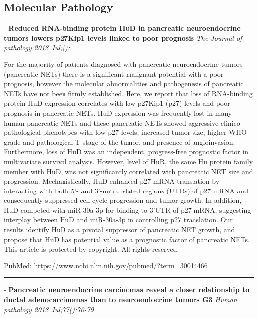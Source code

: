 \documentclass[]{article}
\begin{document}
\pagebreak

\hypertarget{molecular-pathology}{%
\subsection{Molecular Pathology}\label{molecular-pathology}}

 - \textbf{Reduced RNA-binding protein HuD in pancreatic neuroendocrine
tumors lowers p27Kip1 levels linked to poor prognosis} \emph{The Journal
of pathology 2018 Jul;():}

For the majority of patients diagnosed with pancreatic neuroendocrine
tumors (pancreatic NETs) there is a significant malignant potential with
a poor prognosis, however the molecular abnormalities and pathogenesis
of pancreatic NETs have not been firmly established. Here, we report
that loss of RNA-binding protein HuD expression correlates with low
p27Kip1 (p27) levels and poor prognosis in pancreatic NETs. HuD
expression was frequently lost in many human pancreatic NETs and these
pancreatic NETs showed aggressive clinico-pathological phenotypes with
low p27 levels, increased tumor size, higher WHO grade and pathological
T stage of the tumor, and presence of angioinvasion. Furthermore, loss
of HuD was an independent, progress-free prognostic factor in
multivariate survival analysis. However, level of HuR, the same Hu
protein family member with HuD, was not significantly correlated with
pancreatic NET size and progression. Mechanistically, HuD enhanced p27
mRNA translation by interacting with both 5'- and 3'-untranslated
regions (UTRs) of p27 mRNA and consequently suppressed cell cycle
progression and tumor growth. In addition, HuD competed with miR-30a-3p
for binding to 3'UTR of p27 mRNA, suggesting interplay between HuD and
miR-30a-3p in controlling p27 translation. Our results identify HuD as a
pivotal suppressor of pancreatic NET growth, and propose that HuD has
potential value as a prognostic factor of pancreatic NETs. This article
is protected by copyright. All rights reserved.

PubMed: \url{https://www.ncbi.nlm.nih.gov/pubmed/?term=30014466}

{}

{}

\begin{center}\rule{0.5\linewidth}{\linethickness}\end{center}

 - \textbf{Pancreatic neuroendocrine carcinomas reveal a closer
relationship to ductal adenocarcinomas than to neuroendocrine tumors G3}
\emph{Human pathology 2018 Jul;77():70-79}
\end{document}
